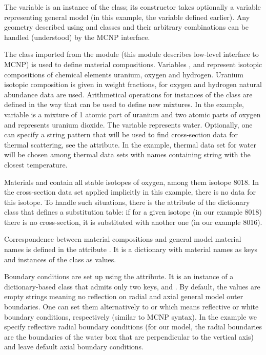 \documentclass[a4paper,10pt,twocolumn,english]{sphinxsnamc2013}
\begin{document}
The  variable is an instance of the  class; its
constructor takes optionally a variable representing general model (in this
example, the variable  defined earlier). Any geometry described using
 and  classes and their arbitrary combinations can be
handled (understood) by the MCNP interface.

The  class imported from the  module (this module describes
low-level interface to MCNP) is used to define material compositions. Variables
,  and  represent isotopic compositions of chemical elements
uranium, oxygen and hydrogen. Uranium
isotopic composition is given in weight fractions, for oxygen and hydrogen
natural abundance data \cite{natAbund2011} are used. Arithmetical
operations for instances of the  class are defined in the way that
can be used to define new mixtures. In the example, variable  is a mixture
of 1 atomic part of uranium and two atomic parts of oxygen and represents
uranium dioxide.  The  variable represents water. Optionally, one can
specify a string pattern that will be used to find cross-section data for
thermal scattering, see the  attribute. In the example, thermal data
set for water will be chosen among thermal data sets with names containing
 string with the closest temperature.

Materials  and  contain all
stable isotopes of oxygen, among them isotope 8018. In the
cross-section data set applied implicitly in this example, there is no data for
this isotope. To handle such situations, there is the  attribute of the
dictionary class that defines a substitution table: if for a given isotope (in
our example 8018) there is no cross-section, it is substituted with another one
(in our example 8016).

Correspondence between material compositions and general model material names
is defined in the attribute . It is a dictionary with
material names as keys and instances of the  class as values.

Boundary conditions are set up using the  attribute. It is an instance of
a dictionary-based class that admits only two keys,  and .
By default, the values are empty strings meaning no reflection on radial and
axial general model outer boundaries. One can set them alternatively to 
or   which means reflective or white boundary conditions, respectively
(similar to MCNP syntax). In the example we specify reflective radial boundary
conditions (for our model, the radial boundaries are the boundaries of the
water box that are perpendicular to the vertical axis) and leave default axial
boundary conditions.
\end{document}
